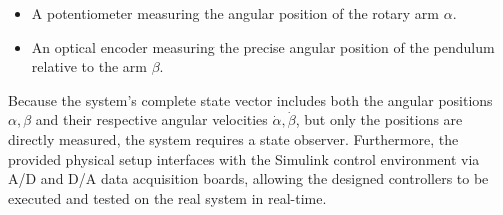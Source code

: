 \vspace{1pt}

\begin{itemize}
    \item A potentiometer measuring the angular position of the rotary arm $\alpha$.
    \item An optical encoder measuring the precise angular position of the pendulum relative to the arm $\beta$.
\end{itemize}

\vspace{2pt}

\par Because the system's complete state vector includes both the angular positions $\alpha, \beta$ and their respective angular 
velocities $\dot{\alpha}, \dot{\beta}$, but only the positions are directly measured, the system requires a state observer. 
Furthermore, the provided physical setup interfaces with the Simulink control environment via A/D and D/A data acquisition boards, 
allowing the designed controllers to be executed and tested on the real system in real-time.
